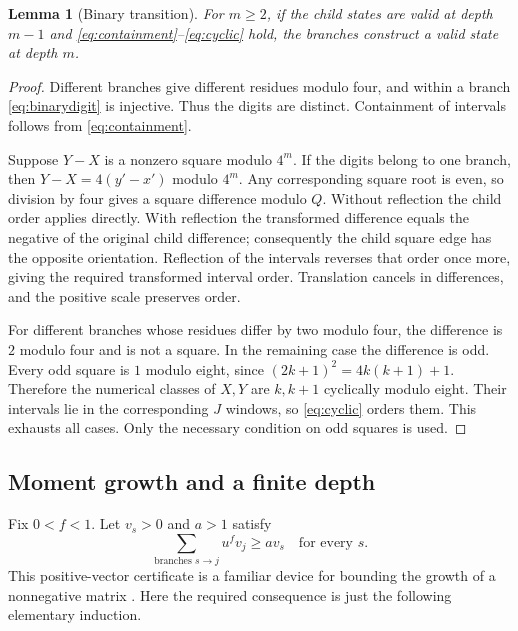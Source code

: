 \documentclass[11pt]{article}
\newtheorem{lemma}[theorem]{Lemma}
\theoremstyle{definition}
\theoremstyle{remark}
\begin{document}
\begin{lemma}[Binary transition]\label{lem:binary}
For $m\ge2$, if the child states are valid at depth $m-1$ and
\eqref{eq:containment}--\eqref{eq:cyclic} hold, the branches construct a
valid state at depth $m$.
\end{lemma}
\begin{proof}
Different branches give different residues modulo four, and within a
branch \eqref{eq:binarydigit} is injective. Thus the digits are distinct.
Containment of intervals follows from \eqref{eq:containment}.

Suppose $Y-X$ is a nonzero square modulo $4^m$. If the digits belong to
one branch, then $Y-X=4(y'-x')$ modulo $4^m$. Any corresponding square root
is even, so division by four gives a square difference modulo $Q$.
Without reflection the child order applies directly. With reflection the
transformed difference equals the negative of the original child
difference; consequently the child square edge has the opposite orientation.
Reflection of the intervals reverses that order once more, giving the
required transformed interval order. Translation cancels in differences,
and the positive scale preserves order.

For different branches whose residues differ by two modulo four, the
difference is $2$ modulo four and is not a square. In the remaining case
the difference is odd. Every odd square is $1$ modulo eight, since
$(2k+1)^2=4k(k+1)+1$. Therefore the numerical classes of $X,Y$ are
$k,k+1$ cyclically modulo eight. Their intervals lie in the corresponding
$J$ windows, so \eqref{eq:cyclic} orders them. This exhausts all cases.
Only the necessary condition on odd squares is used.
\end{proof}

\subsection{Moment growth and a finite depth}
Fix $0<f<1$. Let $v_s>0$ and $a>1$ satisfy
\begin{equation}\label{eq:rows}
 \sum_{\text{branches }s\to j}u^f v_j\ge a v_s\quad\text{for every }s.
\end{equation}
This positive-vector certificate is a familiar device for bounding the
growth of a nonnegative matrix \cite{Seneta2006}. Here the required
consequence is just the following elementary induction.
\end{document}
